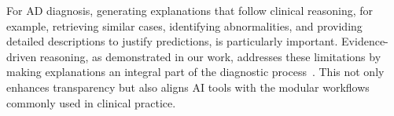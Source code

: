 For AD diagnosis, generating explanations that follow clinical reasoning, for example, retrieving similar cases, identifying abnormalities, and providing detailed descriptions to justify predictions, is particularly important. Evidence-driven reasoning, as demonstrated in our work, addresses these limitations by making explanations an integral part of the diagnostic process~\cite{mckinney2020international}. This not only enhances transparency but also aligns AI tools with the modular workflows commonly used in clinical practice.